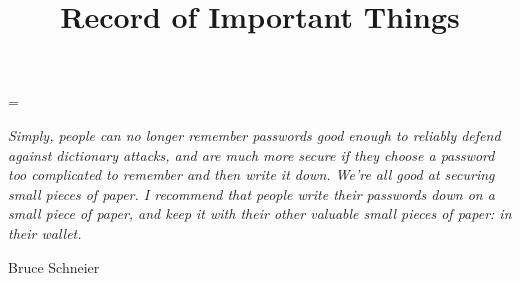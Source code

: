 \documentclass[12pt]{memoir}
\title{\LARGE \textbf{Record of Important Things}}
\date{}
\begin{document}

\maketitle

\newpage

\vspace*{\fill}

\begin{adjustwidth}{0.175in}{0.175in}
	\fontsize{9}{11}\selectfont
	
	\emergencystretch=\maxdimen
	
	\textit{Simply, people can no longer remember passwords good enough to reliably defend against dictionary attacks, and are much more secure if they choose a password too complicated to remember and then write it down.
		We're all good at securing small pieces of paper. 
		I recommend that people write their passwords down on a small piece of paper, and keep it with their other valuable small pieces of paper: in their wallet.}
	\par\flushright\textup{Bruce Schneier} %
	
\end{adjustwidth}
\normalsize

\vspace*{\fill}



\clearpage
{}

\newcommand{\mypagerule}{
	\vspace{-.15in} \\ \rule{\textwidth}{.4pt}
}



































\end{document}

